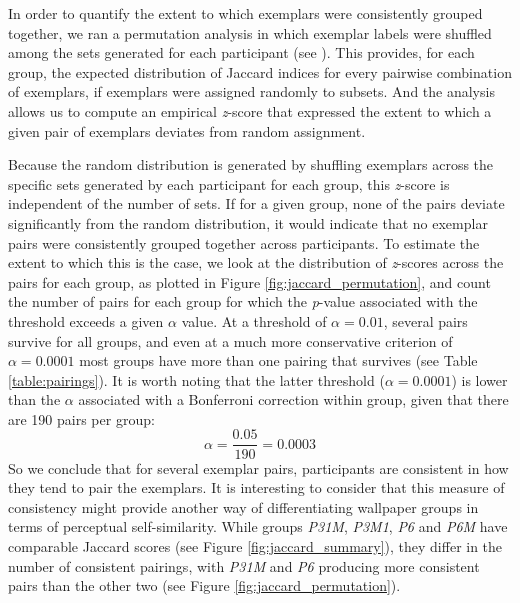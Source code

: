 \documentclass[11pt, twoside]{article}
\providecommand{\DIFaddend}{} %
\DeclareRobustCommand{\DIFaddend}{\DIFOaddend \let\includegraphics\DIFOincludegraphics} %
\begin{document}
\DIFaddend 

In order to quantify the extent to which exemplars were consistently grouped together, we ran a permutation analysis in which exemplar labels were shuffled among the sets generated for each participant (see ). This provides, for each group, the expected distribution of Jaccard indices for every pairwise combination of exemplars, if exemplars were assigned randomly to subsets. And the analysis allows us to compute an empirical \textit{z}-score that expressed the extent to which a given pair of exemplars deviates from random assignment. 

Because the random distribution is generated by shuffling exemplars across the specific sets generated by each participant for each group, this \textit{z}-score is independent of the number of sets. If for a given group, none of the pairs deviate significantly from the random distribution, it would indicate that no exemplar pairs were consistently grouped together across participants. To estimate the extent to which this is the case, we look at the distribution of \textit{z}-scores across the pairs for each group, as plotted in Figure \ref{fig:jaccard_permutation}, and count the number of pairs for each group for which the \textit{p}-value associated with the threshold exceeds a given $\alpha$ value. At a threshold of $\alpha = 0.01$, several pairs survive for all groups, and even at a much more conservative criterion of $\alpha = 0.0001$ most groups have more than one pairing that survives (see Table \ref{table:pairings}). It is worth noting that the latter threshold ($\alpha = 0.0001$) is lower than the $\alpha$ associated with a Bonferroni correction within group, given that there are 190 pairs per group: \[ \alpha = \frac{0.05}{190} = 0.0003 \] So we conclude that for several exemplar pairs, participants are consistent in how they tend to pair the exemplars. It is interesting to consider that this measure of consistency might provide another way of differentiating wallpaper groups in terms of perceptual self-similarity. While groups \textit{P31M}, \textit{P3M1}, \textit{P6} and \textit{P6M} have comparable Jaccard scores (see Figure \ref{fig:jaccard_summary}), they differ in the number of consistent pairings, with \textit{P31M} and \textit{P6} producing more consistent pairs than the other two (see Figure \ref{fig:jaccard_permutation}). 
\end{document}
